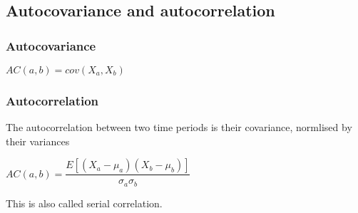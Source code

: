 
\subsection{Autocovariance and autocorrelation}

\subsubsection{Autocovariance}

\(AC(a,b)=cov(X_a, X_b)\)

\subsubsection{Autocorrelation}

The autocorrelation between two time periods is their covariance, normlised by their variances

\(AC(a,b)=\dfrac{E[(X_a-\mu_a)(X_b-\mu_b)]}{\sigma_a \sigma_b}\)

This is also called serial correlation.

